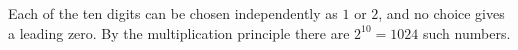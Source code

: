 Each of the ten digits can be chosen independently as $1$ or $2$, and no choice gives a leading zero. By the multiplication principle there are $2^{10}=\boxed{1024}$ such numbers.
